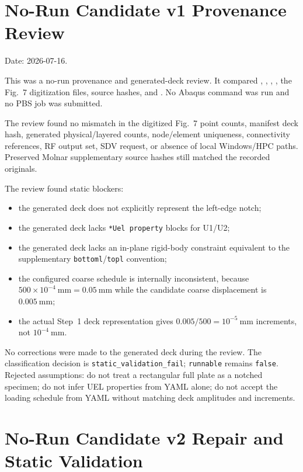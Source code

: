 \documentclass[11pt,a4paper]{article}
\begin{document}
\section{No-Run Candidate v1 Provenance Review}

Date: 2026-07-16.

This was a no-run provenance and generated-deck review. It compared , , , , the Fig.~7 digitization files, source hashes, and . No Abaqus command was run and no PBS job was submitted.

The review found no mismatch in the digitized Fig.~7 point counts, manifest deck hash, generated physical/layered counts, node/element uniqueness, connectivity references, RF output set, SDV request, or absence of local Windows/HPC paths. Preserved Molnar supplementary source hashes still matched the recorded originals.

The review found static blockers:
\begin{itemize}
  \item the generated deck does not explicitly represent the left-edge notch;
  \item the generated deck lacks \texttt{*Uel property} blocks for U1/U2;
  \item the generated deck lacks an in-plane rigid-body constraint equivalent to the supplementary \texttt{bottoml}/\texttt{topl} convention;
  \item the configured coarse schedule is internally inconsistent, because \(500\times10^{-4}\ \mathrm{mm}=0.05\ \mathrm{mm}\) while the candidate coarse displacement is \(0.005\ \mathrm{mm}\);
  \item the actual Step~1 deck representation gives \(0.005/500=10^{-5}\ \mathrm{mm}\) increments, not \(10^{-4}\ \mathrm{mm}\).
\end{itemize}

No corrections were made to the generated deck during the review. The classification decision is \texttt{static\_validation\_fail}; \texttt{runnable} remains \texttt{false}. Rejected assumptions: do not treat a rectangular full plate as a notched specimen; do not infer UEL properties from YAML alone; do not accept the loading schedule from YAML without matching deck amplitudes and increments.

\section{No-Run Candidate v2 Repair and Static Validation}
\end{document}
